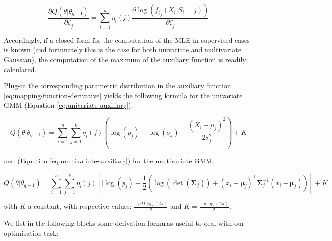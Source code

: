 \begin{equation}
\frac{\partial Q(\theta|\theta_{q-1})}{\partial \zeta_j}=\sum_{i=1}^n  \eta_{i}(j) \frac{\partial \log (f_{\zeta_j}(X_i|S_i=j))}{\partial \zeta_j}
\label{eq:parameter-component-derivative}
\end{equation}

Accordingly, if a closed form for the computation of the MLE in
supervised cases is known (and fortunately this is the case for both univariate and multivariate Gaussian), the computation of the maximum of the
auxiliary function is readily calculated.

Plug-in the corresponding parametric distribution in the auxiliary function \eqref{eq:mapping-function-derivative} yields the following formula for the univariate GMM (Equation
\eqref{eq:univariate-auxiliary}):

\begin{equation}
Q(\theta| \theta_{q-1}) = \sum_{i=1}^n \sum_{j=1}^k \eta_i(j) \left( \log (p_j) - \log (\sigma_j) - \frac{(X_i-\mu_j)^2}{2\sigma_j^2} \right) + K
\label{eq:univariate-auxiliary}
\end{equation}

and (Equation \eqref{eq:multivariate-auxiliary}) for the multivariate GMM:

\begin{equation}
Q(\theta| \theta_{q-1}) = \sum_{i=1}^n \sum_{j=1}^k \eta_i(j) \left[] \log (p_j) - \frac{1}{2} \left( \log(\operatorname{det}(\boldsymbol{\Sigma}_j)) + (x_i - \boldsymbol{\mu}_j)^\top \boldsymbol{\Sigma}_j^{-1}(x_i - \boldsymbol{\mu}_j)\right) \right] + K
\label{eq:multivariate-auxiliary}
\end{equation}

with \(K\) a constant, with respective values: \(\frac{-nD\log(2\pi)}{2}\) and \(K=\frac{-n\log(2\pi)}{2}\).

We list in the following blocks some derivation formulas useful to deal with our optimisation task:


